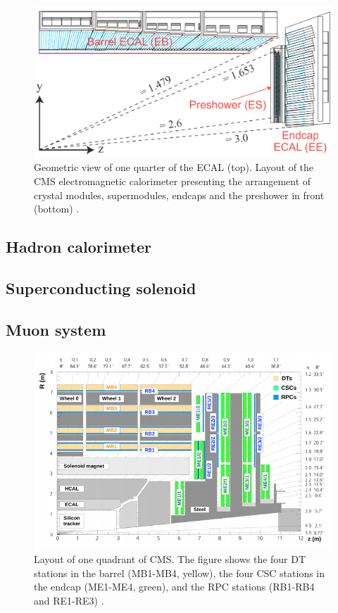 \begin{figure}\label{fig-ECALRapidity}
\includegraphics[width=\textwidth]{Figures/ECALRapidity.png}
\caption{Geometric view of one quarter of the ECAL (top). Layout of the CMS electromagnetic calorimeter presenting the arrangement of crystal modules, supermodules, endcaps and the preshower in front (bottom) \cite{CMSexperiment}.}
\end{figure}

\subsection{Hadron calorimeter} \label{subsec-HadronCalorimeter}

\subsection{Superconducting solenoid} \label{subsec-SuperconductingSolenoid}

\subsection{Muon system} \label{subsec-MuonSystem}

\begin{figure}\label{fig-CMSLongitudinalView}
\includegraphics[width=\textwidth]{Figures/CMSLongitudinalView.png}
\caption{Layout of one quadrant of CMS. The figure shows the four DT stations in the barrel (MB1-MB4, yellow), the four CSC stations in the endcap (ME1-ME4, green), and the RPC stations (RB1-RB4 and RE1-RE3) \cite{CMSexperiment}.}
\end{figure}


